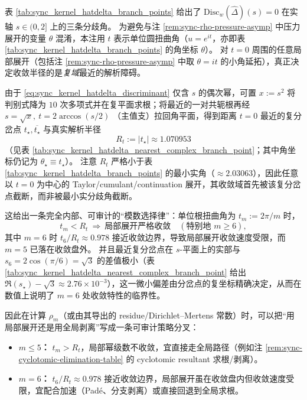 \begin{remark}[真实解析半径：最近复分岔点钉死 \texorpdfstring{$t=0$}{t=0} 的收敛盘]\label{rem:sync-hatdelta-analytic-radius-complex}
表 \ref{tab:sync_kernel_hatdelta_branch_points} 给出了 \(\mathrm{Disc}_w(\widehat\Delta)(s)=0\) 在实轴 \(s\in(0,2]\) 上的三条分歧角。
为避免与注 \ref{rem:sync-rho-pressure-asymp} 中压力展开的变量 \(\theta\) 混淆，本注用 \(t\) 表示单位圆扭曲角（\(u=e^{it}\)，亦即表 \ref{tab:sync_kernel_hatdelta_branch_points} 的角坐标 \(\theta\)）。
对 \(t=0\) 周围的任意局部展开（包括注 \ref{rem:sync-rho-pressure-asymp} 中取 \(\theta=it\) 的小角延拓），真正决定收敛半径的是\emph{复域}最近的解析障碍。
\par
由于 \eqref{eq:sync_kernel_hatdelta_discriminant} 仅含 \(s\) 的偶次幂，可置 \(x:=s^2\) 将判别式降为 \(10\) 次多项式并在复平面求根；将最近的一对共轭根再经
\(
s=\sqrt{x},\ 
t=2\arccos(s/2)
\)
（主值支）拉回角平面，得到距离 \(t=0\) 最近的复分岔点 \(t_\star,\overline{t_\star}\) 与真实解析半径
\[
\boxed{\;R_t:=|t_\star|\approx 1.070953\;}
\]
（见表 \ref{tab:sync_kernel_hatdelta_nearest_complex_branch_point}；其中角坐标仍记为 \(\theta_\star\equiv t_\star\)）。
注意 \(R_t\) 严格小于表 \ref{tab:sync_kernel_hatdelta_branch_points} 的最小实角（\(\approx 2.03063\)），因此任意以 \(t=0\) 为中心的 Taylor/cumulant/continuation 展开，其收敛域首先被该复分岔点截断，而非被最小实分歧角截断。
\par
这给出一条完全内部、可审计的“模数选择律”：单位根扭曲角为 \(t_m:=2\pi/m\) 时，
\[
t_m<R_t\ \Longrightarrow\ \text{局部展开严格收敛}\quad(\text{特别地 }m\ge 6),
\]
其中 \(m=6\) 时 \(t_6/R_t\approx 0.978\) 接近收敛边界，导致局部展开收敛速度受限，而 \(m=5\) 已落在收敛盘外。
并且最近复分岔点在 \(s\)-平面上的实部与 \(s_6=2\cos(\pi/6)=\sqrt3\) 的差值极小（表 \ref{tab:sync_kernel_hatdelta_nearest_complex_branch_point} 给出 \(\Re(s_\star)-\sqrt3\approx 2.76\times 10^{-3}\)），这一微小偏差由分岔点的复坐标精确决定，从而在数值上说明了 \(m=6\) 处收敛特性的临界性。
\par
因此在计算 \(\rho_m\)（或由其导出的 residue/Dirichlet--Mertens 常数）时，可以把“用局部展开还是用全局剥离”写成一条可审计策略分叉：
\begin{itemize}
  \item \textbf{\(m\le 5\)：} \(t_m>R_t\)，局部幂级数不收敛，宜直接走全局路径（例如注 \ref{rem:sync-cyclotomic-elimination-table} 的 cyclotomic resultant 求根/剥离）。
  \item \textbf{\(m=6\)：} \(t_6/R_t\approx 0.978\) 接近收敛边界，局部展开虽在收敛盘内但收敛速度受限，宜配合加速（Pad\'e、分支剥离）或直接回退到全局求根。

\end{itemize}
\end{remark}
